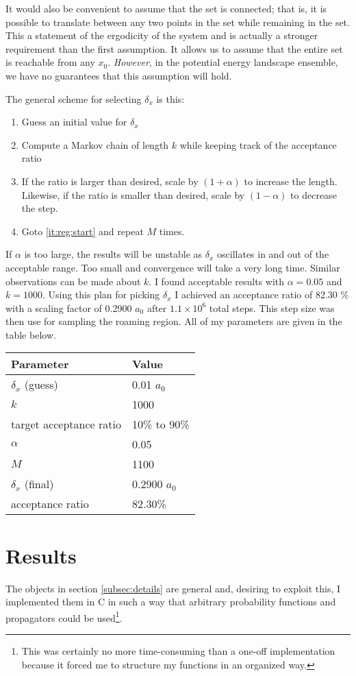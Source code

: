 \documentclass[letterpaper,12pt]{article}
\begin{document}
It would also be convenient to assume that the set is connected; that is, it is possible to translate between any two points in the set while remaining in the set. This a statement of the ergodicity of the system and is actually a stronger requirement than the first assumption. It allows us to assume that the entire set is reachable from any $x_0$. \emph{However},  in the potential energy landscape ensemble, we have no guarantees that this assumption will hold.

The general scheme for selecting $\delta_x$ is this:
\begin{enumerate}
\item Guess an initial value for ${\delta}_{x}$
\item \label{it:reg:start} Compute a Markov chain of length $k$ while keeping track of the acceptance ratio
\item If the ratio is larger than desired, scale by $(1+\alpha)$ to increase the length. Likewise, if the ratio is smaller than desired, scale by $(1-\alpha)$ to decrease the step.
\item Goto \ref{it:reg:start} and repeat $M$ times.
\end{enumerate}

If $\alpha$ is too large, the results will be unstable as $\delta_x$ oscillates in and out of the acceptable range. Too small and convergence will take a very long time. Similar observations can be made about $k$. I found acceptable results with $\alpha=0.05$ and $k=1000$. Using this plan for picking $\delta_x$ I achieved an acceptance ratio of 82.30 \%  with a scaling factor of 0.2900 $a_0$ after $1.1 \times 10^6$ total steps. This step size was then use for sampling the roaming region. All of my parameters are given in the table below.
\begin{center}
\begin{tabular}{l l}
Parameter & Value \\
\hline
 ${\delta}_x$ (guess) & 0.01 $a_0$ \\
$k$ & 1000 \\
target acceptance ratio & 10\% to 90\% \\
$\alpha$ & 0.05 \\
$M$ & 1100 \\
\hline
 ${\delta}_x$ (final) & 0.2900 $a_0$ \\
acceptance ratio & 82.30\%
\end{tabular}
\end{center}

\section{Results}
The objects in section \ref{subsec:details} are general and, desiring to exploit this, I implemented them in C in such a way that arbitrary probability functions and propagators could be used\footnote{This was certainly no more time-consuming than a one-off implementation because it forced me to structure my functions in an organized way.}.
\end{document}
